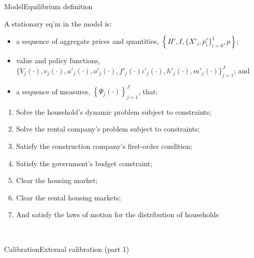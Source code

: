 \documentclass[11pt,aspectratio=169]{beamer}
\begin{document}
\begin{frame}{Model}{Equilibrium definition}

A stationary eq'm in the model is:

\begin{itemize}
    \item a sequence of aggregate prices and quantities, $\left\{H',I,\{X'_{i},\overline{p}^{r}_{i}\}^{1}_{i=0},p\right\}$;
    \item value and policy functions, $\biggl\{V_{j}(\cdot),c_{j}(\cdot),a'_{j}(\cdot),o'_{j}(\cdot),f'_{j}(\cdot)\iota'_{j}(\cdot),h'_{j}(\cdot),m'_{j}(\cdot)\biggl\}_{j=1}^J$; and
    \item a sequence of measures, $\left\{\Psi_{j}(\cdot)\right\}_{j=1}^J$, that:
\end{itemize}
\begin{enumerate}
\item Solve the household's dynamic problem subject to constraints;
\item Solve the rental company's problem subject to constraints;
\item Satisfy the construction company's first-order condition;
\item Satisfy the government's budget constraint;
\item Clear the housing market;
\item Clear the rental housing markets;
\item And satisfy the laws of motion for the distribution of households
\end{enumerate}
    
\end{frame}

{
\begin{frame}{}

\centering \Large
\textcolor{white}{Calibration}
    
\end{frame}

}

\begin{frame}{Calibration}{External calibration (part 1)}



\end{frame}
\end{document}
